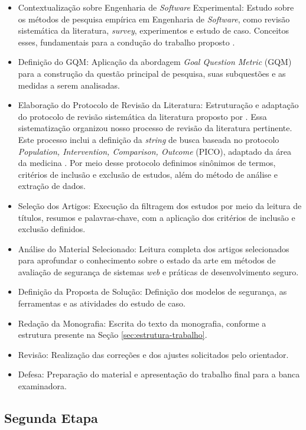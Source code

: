 \begin{itemize}
    \item Contextualização sobre Engenharia de \textit{Software} Experimental: Estudo sobre os métodos de pesquisa empírica em Engenharia de \textit{Software}, como revisão sistemática da literatura, \textit{survey}, experimentos e estudo de caso. Conceitos esses, fundamentais para a condução do trabalho proposto \cite{Wohlin:2012:ESE:2349018}.
    \item Definição do GQM: Aplicação da abordagem \textit{Goal Question Metric} (GQM) \cite{gqm} para a construção da questão principal de pesquisa, suas subquestões e as medidas a serem analisadas.
    \item Elaboração do Protocolo de Revisão da Literatura: Estruturação e adaptação do protocolo de revisão sistemática da literatura proposto por . Essa sistematização organizou nosso processo de revisão da literatura pertinente. Este processo inclui a definição da \textit{string} de busca baseada no protocolo \textit{Population, Intervention, Comparison, Outcome} (PICO), adaptado da área da medicina \cite{pai_clinical_2004}. Por meio desse protocolo definimos sinônimos de termos, critérios de inclusão e exclusão de estudos, além do método de análise e extração de dados.
    \item Seleção dos Artigos: Execução da filtragem dos estudos por meio da leitura de títulos, resumos e palavras-chave, com a aplicação dos critérios de inclusão e exclusão definidos.
    \item Análise do Material Selecionado: Leitura completa dos artigos selecionados para aprofundar o conhecimento sobre o estado da arte em métodos de avaliação de segurança de sistemas \textit{web} e práticas de desenvolvimento seguro.
    \item Definição da Proposta de Solução: Definição dos modelos de segurança, as ferramentas e as atividades do estudo de caso.
    \item Redação da Monografia: Escrita do texto da monografia, conforme a estrutura presente na Seção \ref{sec:estrutura-trabalho}.
    \item Revisão: Realização das correções e dos ajustes solicitados pelo orientador.
    \item Defesa: Preparação do material e apresentação do trabalho final para a banca examinadora.
\end{itemize}

\subsection{Segunda Etapa}

